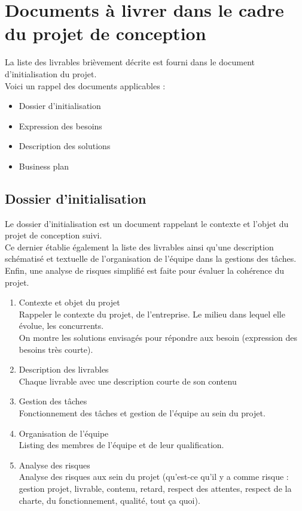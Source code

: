 \documentclass[11pt, a4paper]{article}
\begin{document}
\section{Documents à livrer dans le cadre du projet de conception}
La liste des livrables brièvement décrite est fourni dans le document
d'initialisation du projet. \\

Voici un rappel des documents applicables :
\begin{itemize}
  \item Dossier d'initialisation
  \item Expression des besoins
  \item Description des solutions
  \item Business plan
\end{itemize}

\subsection{Dossier d'initialisation}
Le dossier d'initialisation est un document rappelant le contexte et l'objet du
projet de conception suivi. \\

Ce dernier établie également la liste des livrables ainsi qu'une description
schématisé et textuelle de l'organisation de l'équipe dans la gestions des
tâches. \\
Enfin, une analyse de risques simplifié est faite pour évaluer la cohérence du
projet. \\

\begin{enumerate}
  \item Contexte et objet du projet
    \\ Rappeler le contexte du projet, de l'entreprise. Le milieu dans lequel elle
    évolue, les concurrents.
    \\ On montre les solutions envisagés pour répondre aux besoin (expression des
    besoins très courte).
  \item Description des livrables
    \\ Chaque livrable avec une description courte de son contenu
  \item Gestion des tâches
    \\ Fonctionnement des tâches et gestion de l'équipe au sein du projet.
  \item Organisation de l'équipe
    \\ Listing des membres de l'équipe et de leur qualification.
  \item Analyse des risques
    \\ Analyse des risques aux sein du projet (qu'est-ce qu'il y a comme risque :
    gestion projet, livrable, contenu, retard, respect des attentes, respect de
    la charte, du fonctionnement, qualité, tout ça quoi).
\end{enumerate}
\end{document}
